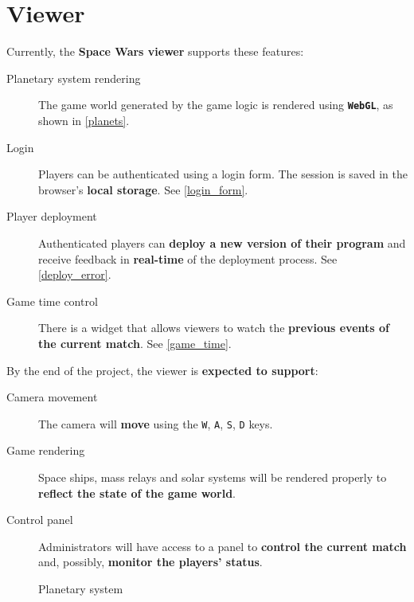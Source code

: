 \documentclass[a4paper,11pt,titlepage,abstract,numbers=noenddot,automark,mnsy,intlimits,rgb,dvipsnames]{report}
\begin{document}
\section{Viewer}
Currently, the \textbf{Space Wars viewer} supports these features:
\begin{description}
\item[Planetary system rendering]
The game world generated by the game logic is rendered using \textbf{\texttt{WebGL}},
  as shown in \autoref{planets}.
\item[Login]
Players can be authenticated using a login form. The session is saved in the browser's
  \textbf{local storage}.
  See \autoref{login_form}.
\item[Player deployment]
Authenticated players can \textbf{deploy a new version of their program} and receive feedback
  in \textbf{real-time} of the deployment process. See \autoref{deploy_error}.
\item[Game time control]
There is a widget that allows viewers to watch the \textbf{previous events of the
  current match}. See \autoref{game_time}.
\end{description}
\indent
By the end of the project, the viewer is \textbf{expected to support}:
\begin{description}
\item[Camera movement]
The camera will \textbf{move} using the \texttt{W}, \texttt{A}, \texttt{S}, \texttt{D} keys.
\item[Game rendering]
Space ships, mass relays and solar systems will be rendered properly to \textbf{reflect the
  state of the game world}.
\item[Control panel]
Administrators will have access to a panel to \textbf{control the current match} and, possibly,
  \textbf{monitor the players' status}.
\end{description}
\begin{figure}[H]
\noindent{}
\caption{Planetary system}
\label{planets}
\end{figure}
\end{document}
